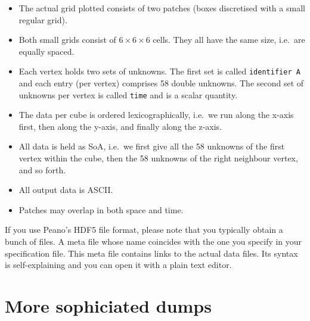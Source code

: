 \begin{itemize}
  \item The actual grid plotted consists of two patches (boxes discretised with
  a small regular grid).
  \item Both small grids consist of $6 \times 6 \times 6$ cells. They all have
  the same size, i.e.~are equally spaced. 
  \item Each vertex holds two sets of unknowns. The first set is called
  \texttt{identifier A} and each entry (per vertex) comprises 58 double
  unknowns. The second set of unknowns per vertex is called \texttt{time} and is
  a scalar quantity.
  \item The data per cube is ordered lexicographically, i.e.~we run along the
  x-axis first, then along the y-axis, and finally along the z-axis. 
  \item All data is held as SoA, i.e.~we first give all the 58 unknowns of the
  first vertex within the cube, then the 58 unknowns of the right neighbour
  vertex, and so forth.
  \item All output data is ASCII.
  \item Patches may overlap in both space and time.
\end{itemize}


\noindent
If you use Peano's HDF5 file format, please note that you typically obtain
a bunch of files. 
A meta file whose name coincides with the one you specify in your specification
file. 
This meta file contains links to the actual data files. 
Its syntax is self-explaining and you can open it with a plain text editor.


\section{More sophiciated dumps}

